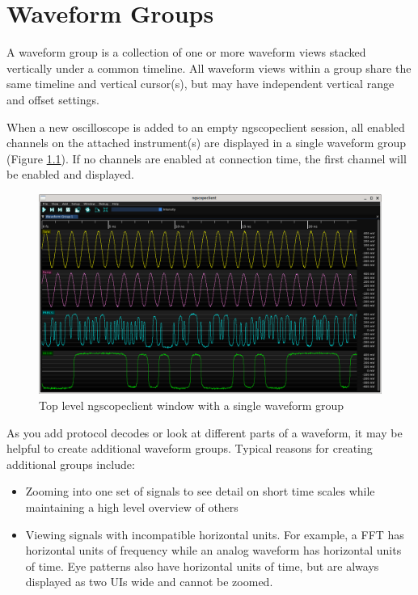 \chapter{Waveform Groups}

A waveform group is a collection of one or more waveform views stacked vertically under a common timeline. All waveform
views within a group share the same timeline and vertical cursor(s), but may have independent vertical range and offset
settings.

When a new oscilloscope is added to an empty ngscopeclient session, all enabled channels on the attached instrument(s)
are displayed in a single waveform group (Figure \ref{single-group}). If no channels are enabled at connection time,
the first channel will be enabled and displayed.

\begin{figure}[h]
\centering
\includegraphics[width=13cm]{ng-images/overview.png}
\caption{Top level ngscopeclient window with a single waveform group}
\label{single-group}
\end{figure}

As you add protocol decodes or look at different parts of a waveform, it may be helpful to create additional waveform
groups. Typical reasons for creating additional groups include:

\begin{itemize}
\item Zooming into one set of signals to see detail on short time scales while maintaining a high level overview of
others
\item Viewing signals with incompatible horizontal units. For example, a FFT has horizontal units of frequency while an
analog waveform has horizontal units of time. Eye patterns also have horizontal units of time, but are always displayed
as two UIs wide and cannot be zoomed.
\end{itemize}

